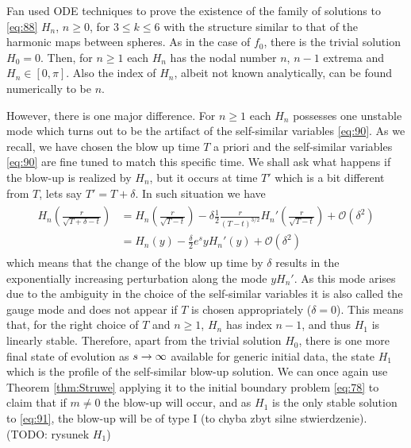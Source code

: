 Fan \cite{Fan1999} used ODE techniques to prove the existence of the
family of solutions to \eqref{eq:88} $H_n$, $n\ge0$, for $3\le k\le6$
with the structure similar to that of the harmonic maps between
spheres. As in the case of $f_0$, there is the trivial solution
$H_0=0$. Then, for $n\ge1$ each $H_n$ has the nodal number $n$, $n-1$
extrema and $H_n\in[0,\pi]$. Also the index of $H_n$, albeit not known
analytically, can be found numerically to be $n$.

However, there is one major difference. For $n\ge1$ each $H_n$
possesses one unstable mode which turns out to be the artifact of the
self-similar variables \eqref{eq:90}. As we recall, we have chosen the
blow up time $T$ a priori and the self-similar variables \eqref{eq:90}
are fine tuned to match this specific time. We shall ask what happens
if the blow-up is realized by $H_n$, but it occurs at time $T'$ which
is a bit different from $T$, lets say $T'=T+\delta$. In such situation
we have
\begin{align}
  \label{eq:92}
  \begin{split}
    H_n\left(\frac{r}{\sqrt{T+\delta-t}}\right)
    &=H_n\left(\frac{r}{\sqrt{T-t}}\right)-\delta\frac{1}{2}\frac{r}{(T-t)^{3/2}}H_n'\left(\frac{r}{\sqrt{T-t}}\right)+\mathcal{O}(\delta^2)\\
    &=H_n(y)-\frac{\delta}{2} e^{s}
    yH_n'(y)+\mathcal{O}(\delta^2)
  \end{split}
\end{align}
which means that the change of the blow up time by $\delta$ results in
the exponentially increasing perturbation along the mode $yH_n'$. As
this mode arises due to the ambiguity in the choice of the
self-similar variables it is also called the gauge mode and does not
appear if $T$ is chosen appropriately ($\delta=0$). This means that,
for the right choice of $T$ and $n\ge1$, $H_n$ has index $n-1$, and
thus $H_1$ is linearly stable. Therefore, apart from the trivial
solution $H_0$, there is one more final state of evolution as
$s\rightarrow\infty$ available for generic initial data, the state $H_1$ which
is the profile of the self-similar blow-up solution. We can once again
use Theorem \ref{thm:Struwe} applying it to the initial boundary
problem \eqref{eq:78} to claim that if $m\ne0$ the blow-up will occur,
and as $H_1$ is the only stable solution to \eqref{eq:91}, the blow-up
will be of type I (to chyba zbyt silne stwierdzenie). (TODO: rysunek
$H_1$)


